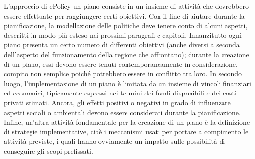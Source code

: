 \documentclass[12pt,a4paper,openright,twoside]{report}
\begin{document}
L'approccio di ePolicy un piano consiste in un insieme di attività che dovrebbero essere effettuate per raggiungere certi obiettivi. Con il fine di aiutare durante la pianificazione, la modellazione delle politiche deve tenere conto di alcuni aspetti, descritti in modo più esteso nei prossimi paragrafi e capitoli. Innanzitutto ogni piano presenta un certo numero di differenti obiettivi (anche diversi a seconda dell'aspetto del funzionamento della regione che affrontano); durante la creazione di un piano, essi devono essere tenuti contemporaneamente in considerazione, compito non semplice poiché potrebbero essere in conflitto tra loro. In secondo luogo, l'implementazione di un piano è limitata da un insieme di vincoli finanziari ed economici, tipicamente espressi nei termini dei fondi disponibili e dei costi privati stimati. Ancora, gli effetti positivi o negativi in grado di influenzare aspetti sociali o ambientali devono essere considerati durante la pianificazione. Infine, un'altra attività fondamentale per la creazione di un piano è la definizione di strategie implementative, cioè i meccanismi usati per portare a compimento le attività previste, i quali hanno ovviamente un impatto sulle possibilità di conseguire gli scopi prefissati.
\end{document}
